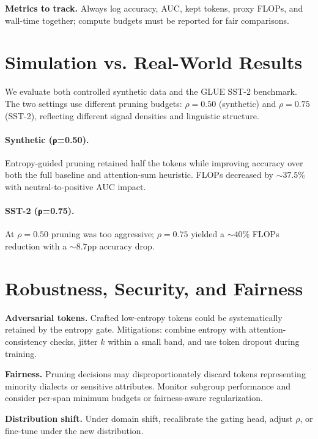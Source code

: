 \documentclass{article}
\begin{document}
\textbf{Metrics to track.} Always log accuracy, AUC, kept tokens, proxy FLOPs, and wall-time together; compute budgets must be reported for fair comparisons.

\section{Simulation vs. Real-World Results}
\label{sec:sim-vs-real}
We evaluate both controlled synthetic data and the GLUE SST-2 benchmark. The two settings use different pruning budgets: $\rho=0.50$ (synthetic) and $\rho=0.75$ (SST-2), reflecting different signal densities and linguistic structure.

\paragraph{Synthetic (ρ=0.50).}
Entropy-guided pruning retained half the tokens while improving accuracy over both the full baseline and attention-sum heuristic. FLOPs decreased by ${\sim}37.5\%$ with neutral-to-positive AUC impact.

\paragraph{SST-2 (ρ=0.75).}
At $\rho=0.50$ pruning was too aggressive; $\rho=0.75$ yielded a ${\sim}40\%$ FLOPs reduction with a ${\sim}8.7$pp accuracy drop.

\section{Robustness, Security, and Fairness}
\label{sec:robust}
\textbf{Adversarial tokens.} Crafted low-entropy tokens could be systematically retained by the entropy gate. Mitigations: combine entropy with attention-consistency checks, jitter $k$ within a small band, and use token dropout during training.

\textbf{Fairness.} Pruning decisions may disproportionately discard tokens representing minority dialects or sensitive attributes. Monitor subgroup performance and consider per-span minimum budgets or fairness-aware regularization.

\textbf{Distribution shift.} Under domain shift, recalibrate the gating head, adjust $\rho$, or fine-tune under the new distribution.

\end{document}
